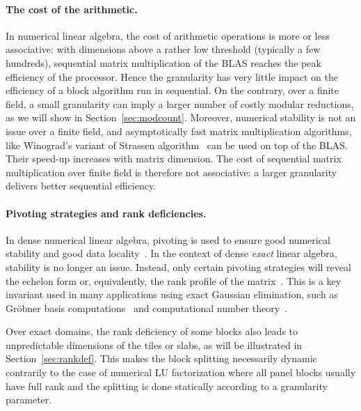 \documentclass{article}
\begin{document}
\paragraph{The cost of the arithmetic.} In numerical linear algebra, the cost of
arithmetic operations is more or less associative: with dimensions above a rather low
threshold (typically a few hundreds), sequential matrix multiplication of the
BLAS reaches the peak efficiency of the processor. Hence the granularity has
very little impact on the efficiency of a block algorithm run in sequential.
On the contrary, over a finite field, a small granularity can imply a larger
number of costly modular reductions, as we will show in Section~\ref{sec:modcount}. 
Moreover,  numerical stability is not an issue over a finite field, and asymptotically fast matrix
multiplication algorithms, like Winograd's variant of Strassen
algorithm~\cite[\S 12]{GG99} can be used on top of the BLAS.  
Their speed-up increases with matrix dimension. The cost of
sequential matrix multiplication over finite field is therefore not associative:
a larger granularity delivers better sequential efficiency. 

 
 
 

\paragraph{Pivoting strategies and rank deficiencies.}
In dense numerical linear algebra, pivoting is used to ensure good
numerical stability and good data locality~\cite{GoVa96}.  
In the context of dense {\em exact} linear algebra, stability is no longer an 
issue. Instead, only certain pivoting strategies  will reveal 
the echelon form or, equivalently, the rank profile of the matrix~\cite{JPS13,DPS13}. This is a key
invariant used in many applications using exact Gaussian elimination, such as
Gr\"obner basis computations~\cite{F99a} and computational number
theory~\cite{stein2007modular}. 
 
 

 
 
 
Over exact domains, the rank deficiency of some blocks also leads to unpredictable
dimensions  of the tiles or slabs, as will be illustrated in Section~\ref{sec:rankdef}.
This makes the block splitting necessarily dynamic contrarily to the case of
numerical LU factorization where all panel blocks usually have full rank
and the splitting is done statically according to a granularity parameter.
 
\end{document}
